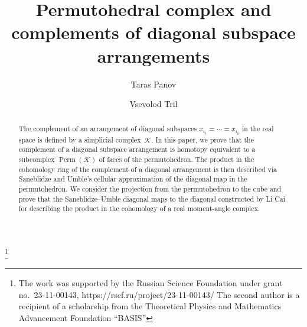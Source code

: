 \documentclass[a4paper,12pt]{amsart}
\newcommand{\K}{\mathcal K}
\theoremstyle{definition}
\theoremstyle{remark}
\numberwithin{equation}{section}
\DeclareMathOperator{\Perm}{Perm}
\begin{document}
\makeatletter
    \def\@@and{and}
\makeatother

\title[Permutohedral complex and complements of diagonal arrangements]{Permutohedral complex and complements of diagonal subspace arrangements}
\author{Taras Panov}
\address{Faculty of Mathematics and Mechanics, Moscow State University, Moscow, Russia;\newline
Institute for Information Transmission Problems (Kharkevich Institute), Russian Academy of Sciences, Moscow, Russia;\newline
Steklov Mathematical Institute of Russian Academy of Sciences, Moscow, Russia;\newline
National Research University Higher School of Economics, Moscow, Russia}

\author{Vsevolod Tril}
\address{Faculty of Mathematics and Mechanics, Moscow State University, Moscow, Russia;\newline
National Research University Higher School of Economics, Moscow, Russia}
\thanks{The work was supported by the Russian Science Foundation under grant no.~23-11-00143, https://rscf.ru/project/23-11-00143/
The second author is a recipient of a scholarship from the Theoretical Physics and Mathematics Advancement Foundation ``BASIS''
}



\begin{abstract}
The complement of an arrangement of diagonal subspaces $x_{i_1} = \cdots = x_{i_k}$ in the real space is defined by a simplicial complex~$\K$.
In this paper, we prove that the complement of a diagonal subspace arrangement is homotopy equivalent to a subcomplex $\Perm(\K)$ of faces of the permutohedron. The product in the cohomology ring of the complement of a diagonal arrangement is then described via Saneblidze and Umble's cellular approximation of the diagonal map in the permutohedron. We consider the projection from the permutohedron to the cube and prove that the Saneblidze--Umble diagonal maps to the diagonal constructed by Li Cai for describing the product in the cohomology of a real moment-angle complex.
\end{abstract}
\end{document}
